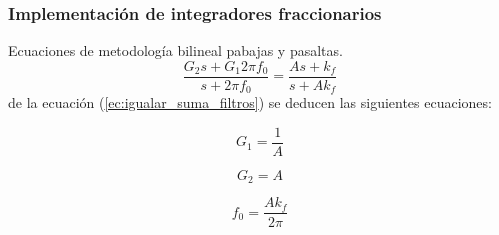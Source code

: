 \documentclass[10pt]{beamer}
\begin{document}
	\begin{frame}
		\frametitle{Implementación de integradores fraccionarios}
		\begin{block}{Ecuaciones de metodología bilineal pabajas y pasaltas.}
			 \begin{equation}
		\frac{G_{2}s + G_{1}2 \pi f_{0}}{s + 2 \pi f_{0}} = \frac{As + k_{f}}{s + Ak_{f}}
		\label{ec:igualar_suma_filtros}
	\end{equation}
	de la ecuación (\ref{ec:igualar_suma_filtros}) se deducen las siguientes ecuaciones:
	
	\begin{equation}
		G_{1} = \frac{1}{A}
	\end{equation}	
	
	\begin{equation}
		G_{2} = A
	\end{equation}
	
	\begin{equation}
		f_{0} = \frac{A k_{f}}{2 \pi}
	\end{equation}
		\end{block}
	\end{frame}
\end{document}
